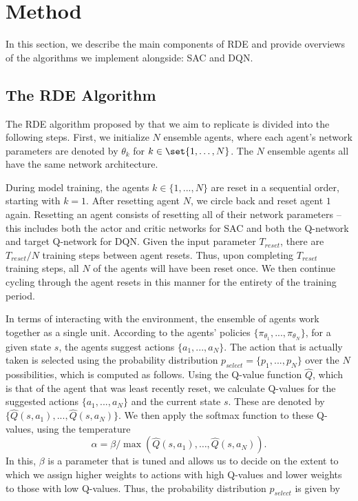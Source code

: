 \documentclass[base]{subfiles}
\begin{document}
\section{Method}
\label{sec:method}

In this section, we describe the main components of RDE and provide overviews of the algorithms we implement alongside: SAC and DQN.

\subsection{The RDE Algorithm}

The RDE algorithm proposed by \cite{kim2023} that we aim to replicate is divided into the following steps. 
First, we initialize $N$ ensemble agents, where each agent's network parameters are denoted by $\theta_k$ for $k \in \set{1, \dots, N}$. 
The $N$ ensemble agents all have the same network architecture.

During model training, the agents $k \in \{ 1,...,N \}$ are reset in a sequential order, starting with $k=1$. 
After resetting agent $N$, we circle back and reset agent $1$ again.
Resetting an agent consists of resetting all of their network parameters -- this includes both the actor and critic networks for SAC and both the Q-network and target Q-network for DQN. 
Given the input parameter $T_{reset}$, there are $T_{reset} / N$ training steps between agent resets.
Thus, upon completing $T_{reset}$ training steps, all $N$ of the agents will have been reset once. 
We then continue cycling through the agent resets in this manner for the entirety of the training period.

In terms of interacting with the environment, the ensemble of agents work together as a single unit. 
According to the agents' policies $\{ \pi_{\theta_1}, ..., \pi_{\theta_N} \}$, for a given state $s$, the agents suggest actions $\{ a_1, ..., a_N \}$. 
The action that is actually taken is selected using the probability distribution $p_{select} = \{ p_1, ..., p_N \}$ over the $N$ possibilities, which is computed as follows.
Using the Q-value function $\hat{Q}$, which is that of the agent that was least recently reset, we calculate Q-values for the suggested actions $\{ a_1, ..., a_N \}$ and the current state $s$. 
These are denoted by $\{ \hat{Q} (s, a_1), ..., \hat{Q} (s, a_N) \}$. 
We then apply the softmax function to these Q-values, using the temperature
\[\alpha = \beta / \max(\hat{Q} (s, a_1), \dots, \hat{Q} (s, a_N)).\]
In this, $\beta$ is a parameter that is tuned and allows us to decide on the extent to which we assign higher weights to actions with high Q-values and lower weights to those with low Q-values.
Thus, the probability distribution $p_{select}$ is given by 
\end{document}
